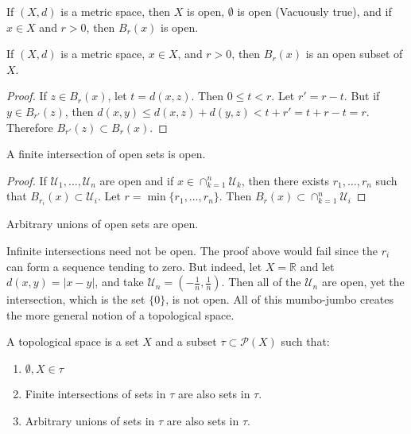 \documentclass[crop=false,class=article,oneside]{standalone}
\begin{document}
            \begin{example}
                If $(X,d)$ is a metric space, then
                $X$ is open, $\emptyset$ is open
                (Vacuously true), and if $x\in{X}$ and
                $r>0$, then $B_{r}(x)$ is open.
            \end{example}
            \begin{theorem}
                If $(X,d)$ is a metric space, $x\in{X}$,
                and $r>0$, then $B_{r}(x)$ is an open
                subset of $X$.
            \end{theorem}
            \begin{proof}
                If $z\in{B_{r}(x)}$, let $t=d(x,z)$.
                Then $0\leq{t}<r$. Let $r'=r-t$.
                But if $y\in{B_{r'}(z)}$, then
                $d(x,y)\leq{d(x,z)+d(y,z)}<t+r'=t+r-t=r$.
                Therefore $B_{r'}(z)\subset{B_{r}(x)}$.
            \end{proof}
            \begin{theorem}
                A finite intersection of open sets is open.
            \end{theorem}
            \begin{proof}
                If $\mathcal{U}_{1},\hdots,\mathcal{U}_{n}$
                are open and if
                $x\in\cap_{k=1}^{n}\mathcal{U}_{k}$, then there
                exists $r_{1},\hdots,r_{n}$ such that
                $B_{r_{i}}(x)\subset\mathcal{U}_{i}$. Let
                $r=\min\{r_{1},\hdots,r_{n}\}$. Then
                $B_{r}(x)\subset\cap_{k=1}^{n}\mathcal{U}_{i}$
            \end{proof}
            \begin{theorem}
                Arbitrary unions of open sets are open.
            \end{theorem}
            Infinite intersections need not be open.
            The proof above would fail since the
            $r_{i}$ can form a sequence tending to zero.
            But indeed, let $X=\mathbb{R}$ and let
            $d(x,y)=|x-y|$, and take
            $\mathcal{U}_{n}=(-\frac{1}{n},\frac{1}{n})$.
            Then all of the $\mathcal{U}_{n}$ are open,
            yet the intersection, which is the set $\{0\}$,
            is not open. All of this mumbo-jumbo creates
            the more general notion of a topological space.
            \begin{definition}
                A topological space is a set $X$ and a
                subset $\tau\subset\mathcal{P}(X)$ such that:
                \begin{enumerate}
                    \item $\emptyset,X\in\tau$
                    \item Finite intersections of sets in $\tau$
                          are also sets in $\tau$.
                    \item Arbitrary unions of sets in $\tau$
                          are also sets in $\tau$.
                \end{enumerate}
            \end{definition}
\end{document}
